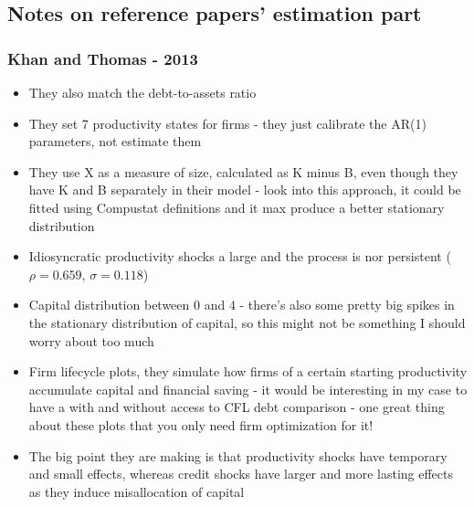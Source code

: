 \documentclass[12pt]{article}
\begin{document}
\newpage
\subsection*{Notes on reference papers' estimation part}
\subsubsection*{Khan and Thomas - 2013}
\begin{itemize}\setlength\itemsep{0em} \small
    \item They also match the debt-to-assets ratio
    \item They set 7 productivity states for firms - they just calibrate the AR(1) parameters, not estimate them
    \item They use X as a measure of size, calculated as K minus B, even though they have K and B separately in their model - look into this approach, it could be fitted using Compustat definitions and it max produce a better stationary distribution
    \item Idiosyncratic productivity shocks a large and the process is nor persistent ($\rho = 0.659$, $\sigma = 0.118$)
    \item Capital distribution between 0 and 4 - there's also some pretty big spikes in the stationary distribution of capital, so this might not be something I should worry about too much
    \item Firm lifecycle plots, they simulate how firms of a certain starting productivity accumulate capital and financial saving - it would be interesting in my case to have a with and without access to CFL debt comparison - one great thing about these plots that you only need firm optimization for it!
    \item The big point they are making is that productivity shocks have temporary and small effects, whereas credit shocks have larger and more lasting effects as they induce misallocation of capital
\end{itemize} \normalsize
\end{document}
